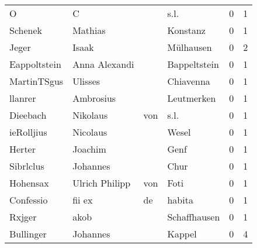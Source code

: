 \begin{center}
\begin{tiny}
\begin{longtabu}{llllrr}
                        O &                                  C &             &                                        s.l. &          0 &         1 \\
                  Schenek &                            Mathias &             &                                    Konstanz &          0 &         1 \\
                    Jeger &                              Isaak &             &                                   Mülhausen &          0 &         2 \\
             Eappoltstein &                      Anna Alexandi &             &                                Bappeltstein &          0 &         1 \\
              MartinTSgus &                            Ulisses &             &                                   Chiavenna &          0 &         1 \\
                  llanrer &                          Ambrosius &             &                                  Leutmerken &          0 &         1 \\
                 Dieebach &                           Nikolaus &         von &                                        s.l. &          0 &         1 \\
               ieRolljius &                           Nicolaus &             &                                       Wesel &          0 &         1 \\
                   Herter &                            Joachim &             &                                        Genf &          0 &         1 \\
                Sibrlclus &                           Johannes &             &                                        Chur &          0 &         1 \\
                 Hohensax &                     Ulrich Philipp &         von &                                        Foti &          0 &         1 \\
                Confessio &                             fii ex &          de &                                      habita &          0 &         1 \\
                   Rxjger &                               akob &             &                                Schaffhausen &          0 &         1 \\
                Bullinger &                           Johannes &             &                                      Kappel &          0 &         4 \\

\end{longtabu}
\end{tiny}
\end{center}
